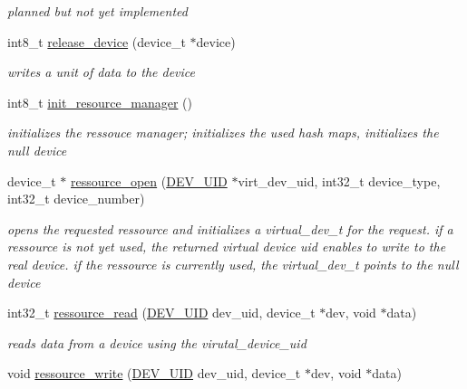 \begin{CompactItemize}
\begin{CompactList}\small\item\em planned but not yet implemented \item\end{CompactList}\item 
int8\_\-t \hyperlink{group___r_e_s_o_u_r_c_e___m_g6169adf2c7a30c3aebdc2e56bd06cbb9}{release\_\-device} (device\_\-t $\ast$device)
\begin{CompactList}\small\item\em writes a unit of data to the device \item\end{CompactList}\item 
int8\_\-t \hyperlink{group___r_e_s_o_u_r_c_e___m_g8af28a02db0b8f6aec83fc5c9654d49f}{init\_\-resource\_\-manager} ()
\begin{CompactList}\small\item\em initializes the ressouce manager; initializes the used hash maps, initializes the null device \item\end{CompactList}\item 
device\_\-t $\ast$ \hyperlink{group___r_e_s_o_u_r_c_e___m_g09c6c96465e7bed0f3026fec51dbf1fc}{ressource\_\-open} (\hyperlink{group___d_e_v_i_c_e___a_p_i_g9f427f7fc1dc07b788af60c2aaa6b8d3}{DEV\_\-UID} $\ast$virt\_\-dev\_\-uid, int32\_\-t device\_\-type, int32\_\-t device\_\-number)
\begin{CompactList}\small\item\em opens the requested ressource and initializes a virtual\_\-dev\_\-t for the request. if a ressource is not yet used, the returned virtual device uid enables to write to the real device. if the ressource is currently used, the virtual\_\-dev\_\-t points to the null device \item\end{CompactList}\item 
int32\_\-t \hyperlink{group___r_e_s_o_u_r_c_e___m_g1a881ac8d628460d6192af633a85c78e}{ressource\_\-read} (\hyperlink{group___d_e_v_i_c_e___a_p_i_g9f427f7fc1dc07b788af60c2aaa6b8d3}{DEV\_\-UID} dev\_\-uid, device\_\-t $\ast$dev, void $\ast$data)
\begin{CompactList}\small\item\em reads data from a device using the virutal\_\-device\_\-uid \item\end{CompactList}\item 
void \hyperlink{group___r_e_s_o_u_r_c_e___m_g3dcd2a4d0edfb34e53f059b90700b846}{ressource\_\-write} (\hyperlink{group___d_e_v_i_c_e___a_p_i_g9f427f7fc1dc07b788af60c2aaa6b8d3}{DEV\_\-UID} dev\_\-uid, device\_\-t $\ast$dev, void $\ast$data)

\end{CompactItemize}
